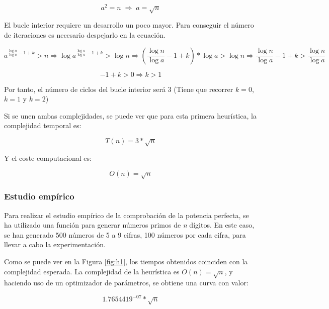 \documentclass{uc3mpracticas}
\begin{document}
  $$ a^2 = n \; \Rightarrow \; a = \sqrt{n} $$

  El bucle interior requiere un desarrollo un poco mayor. Para conseguir el número de iteraciones es necesario despejarlo en la ecuación.

  \vspace{2mm}

  $$ a^{\frac{\log n}{\log a} - 1 + k} > n \Rightarrow \log a^{\frac{\log n}{\log a} - 1 + k} > \log n \Rightarrow (\frac{\log n}{\log a} - 1 + k) * \log a > \log n \Rightarrow  \frac{\log n}{\log a} - 1 + k > \frac{\log n}{\log a}$$

  $$ -1 + k > 0 \Rightarrow k > 1 $$

  Por tanto, el número de ciclos del bucle interior será 3 (Tiene que recorrer $k=0$, $k=1$ y $k=2$)

  \vspace{2mm}

  Si se unen ambas complejidades, se puede ver que para esta primera heurística, la complejidad temporal es:

  $$ T(n) = \displaystyle 3*\sqrt{n}$$

  Y el coste computacional es:

  $$ O(n) = \sqrt{n}$$


  \subsubsection{Estudio empírico}\label{empirico}

  Para realizar el estudio empírico de la comprobación de la potencia perfecta, se ha utilizado una función para generar números primos de \textit{n} dígitos. En este caso, se han generado 500 números de 5 a 9 cifras, 100 números por cada cifra, para llevar a cabo la experimentación.

  \vspace{3mm}


  Como se puede ver en la Figura \ref{fig:h1}, los tiempos obtenidos coinciden con la complejidad esperada. La complejidad de la heurística es $ O(n) = \sqrt{n} $, y haciendo uso de un optimizador de parámetros, se obtiene una curva con valor:

  $$ 1.7654419^{-07} * \sqrt{n} $$

\end{document}
